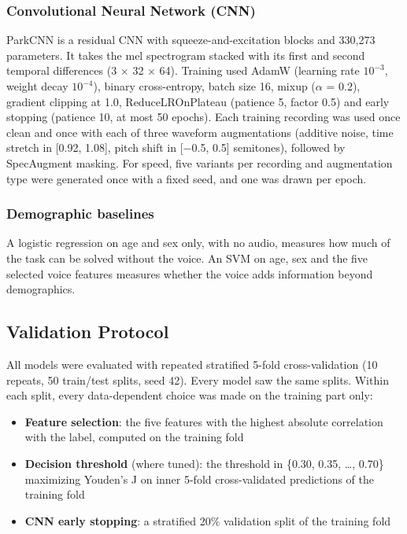 \documentclass{paper}
\begin{document}
\subsubsection{Convolutional Neural Network (CNN)}
ParkCNN is a residual CNN with squeeze-and-excitation blocks and 330,273 parameters. It takes the mel spectrogram stacked with its first and second temporal differences (3 $\times$ 32 $\times$ 64). Training used AdamW (learning rate $10^{-3}$, weight decay $10^{-4}$), binary cross-entropy, batch size 16, mixup ($\alpha$ = 0.2), gradient clipping at 1.0, ReduceLROnPlateau (patience 5, factor 0.5) and early stopping (patience 10, at most 50 epochs). Each training recording was used once clean and once with each of three waveform augmentations (additive noise, time stretch in [0.92, 1.08], pitch shift in [$-$0.5, 0.5] semitones), followed by SpecAugment masking. For speed, five variants per recording and augmentation type were generated once with a fixed seed, and one was drawn per epoch.

\subsubsection{Demographic baselines}
A logistic regression on age and sex only, with no audio, measures how much of the task can be solved without the voice. An SVM on age, sex and the five selected voice features measures whether the voice adds information beyond demographics.

\subsection{Validation Protocol}
All models were evaluated with repeated stratified 5-fold cross-validation (10 repeats, 50 train/test splits, seed 42). Every model saw the same splits. Within each split, every data-dependent choice was made on the training part only:

\begin{itemize}
    \item \textbf{Feature selection}: the five features with the highest absolute correlation with the label, computed on the training fold
    \item \textbf{Decision threshold} (where tuned): the threshold in \{0.30, 0.35, \ldots, 0.70\} maximizing Youden's J on inner 5-fold cross-validated predictions of the training fold
    \item \textbf{CNN early stopping}: a stratified 20\% validation split of the training fold
\end{itemize}
\end{document}
